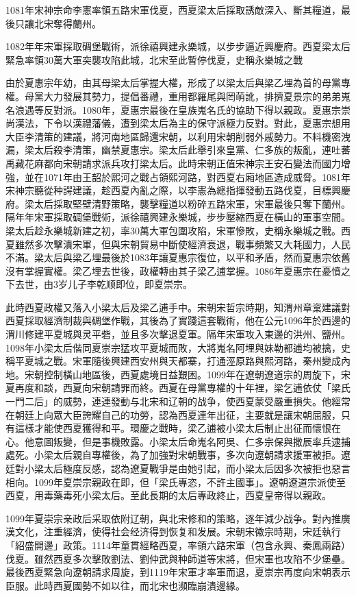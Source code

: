 1081年宋神宗命李憲率領五路宋軍伐夏，西夏梁太后採取誘敵深入、斷其糧道，最後只讓北宋奪得蘭州。

1082年年宋軍採取碉堡戰術，派徐禧興建永樂城，以步步逼近興慶府。西夏梁太后緊急率領30萬大軍突襲攻陷此城，北宋至此暫停伐夏，史稱永樂城之戰

由於夏惠宗年幼，由其母梁太后掌握大權，形成了以梁太后與梁乙埋為首的母黨專權。母黨大力發展其勢力，提倡番禮，重用都羅尾與罔萌訛，排擠夏景宗的弟弟嵬名浪遇等反對派。1080年，夏惠宗最後在皇族嵬名氏的協助下得以親政。夏惠宗崇尚漢法，下令以漢禮藩儀，遭到梁太后為主的保守派極力反對。對此，夏惠宗想用大臣李清策的建議，將河南地區歸還宋朝，以利用宋朝削弱外戚勢力。不料機密洩漏，梁太后殺李清策，幽禁夏惠宗。梁太后此舉引來皇黨、仁多族的叛亂，連吐蕃禹藏花麻都向宋朝請求派兵攻打梁太后。此時宋朝正值宋神宗王安石變法而國力增強，並在1071年由王韶於熙河之戰占領熙河路，對西夏右廂地區造成威脅。1081年宋神宗聽從种諤建議，趁西夏內亂之際，以李憲為總指揮發動五路伐夏，目標興慶府。梁太后採取堅壁清野策略，襲擊糧道以粉碎五路宋軍，宋軍最後只奪下蘭州。隔年年宋軍採取碉堡戰術，派徐禧興建永樂城，步步壓縮西夏在橫山的軍事空間。梁太后趁永樂城新建之初，率30萬大軍包圍攻陷，宋軍慘敗，史稱永樂城之戰。西夏雖然多次擊潰宋軍，但與宋朝貿易中斷使經濟衰退，戰事頻繁又大耗國力，人民不滿。梁太后與梁乙埋最後於1083年讓夏惠宗復位，以平和矛盾，然而夏惠宗依舊沒有掌握實權。梁乙埋去世後，政權轉由其子梁乙逋掌握。1086年夏惠宗在憂憤之下去世，由3岁儿子李乾顺即位，即夏崇宗。

此時西夏政權又落入小梁太后及梁乙逋手中。宋朝宋哲宗時期，知渭州章楶建議對西夏採取經濟制裁與碉堡作戰，其後為了實踐這套戰術，他在公元1096年於西邊的渭川修建平夏城與灵平砦，並且多次擊退夏軍。隔年宋軍攻入東邊的洪州、鹽州。1098年小梁太后偕同夏崇宗猛攻平夏城而敗，大將嵬名阿埋與妹勒都逋均被擒，史稱平夏城之戰。宋軍隨後興建西安州與天都寨，打通涇原路與熙河路，秦州變成內地。宋朝控制橫山地區後，西夏處境日益艱困。1099年在遼朝遼道宗的周旋下，宋夏再度和談，西夏向宋朝請罪而終。西夏在母黨專權的十年裡，梁乞逋依仗「梁氏一門二后」的威勢，連連發動与北宋和辽朝的战争，使西夏蒙受嚴重損失。他經常在朝廷上向眾大臣誇耀自己的功勞，認為西夏連年出征，主要就是讓宋朝屈服，只有這樣才能使西夏獲得和平。環慶之戰時，梁乙逋被小梁太后制止出征而懷恨在心。他意圖叛變，但是事機敗露。小梁太后命嵬名阿吳、仁多宗保與撒辰率兵逮捕處死。小梁太后親自專權後，為了加強對宋朝戰事，多次向遼朝請求援軍被拒。遼廷對小梁太后極度反感，認為遼夏戰爭是由她引起，而小梁太后因多次被拒也惡言相向。1099年夏崇宗親政在即，但「梁氏專恣，不許主國事」。遼朝遼道宗派使至西夏，用毒藥毒死小梁太后。至此長期的太后專政終止，西夏皇帝得以親政。

1099年夏崇宗亲政后采取依附辽朝，與北宋修和的策略，逐年減少战争。對內推廣漢文化，注重經濟，使得社会经济得到恢复和发展。宋朝宋徽宗時期，宋廷執行「紹盛開邊」政策。1114年童貫經略西夏，率領六路宋軍（包含永興、秦鳳兩路）伐夏。雖然西夏多次擊敗劉法、劉仲武與种師道等宋將，但宋軍也攻陷不少堡壘。最後西夏緊急向遼朝請求周旋，到1119年宋軍才率軍而退，夏崇宗再度向宋朝表示臣服。此時西夏國勢不如以往，而北宋也瀕臨崩潰邊緣。

